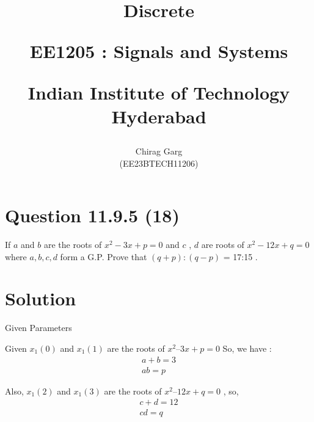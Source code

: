 \documentclass[journal,12pt,twocolumn]{IEEEtran}
\theoremstyle{remark}
\begin{document}
%




\vspace{3cm}

\title{
Discrete

\large{EE1205 : Signals and Systems}

Indian Institute of Technology Hyderabad
}
\author{Chirag Garg

(EE23BTECH11206)
}	





\maketitle

\newpage



\bigskip

\renewcommand{\thefigure}{\arabic{figure}}
\renewcommand{\thetable}{\arabic{table}}


\section{Question 11.9.5 (18)}
\vspace{0.5cm}
\begin{flushleft}
If $a$ and $b$ are the roots of $x^{2} -3x + p = 0$ and $c$ , $d$ are roots of $x^{2} - 12x + q = 0$ where $a,b,c,d$ form a G.P. Prove that $(q+p) : (q-p)$ = 17:15 .
\end{flushleft}  


\vspace{0.8cm}


\section{Solution} 

\begin{table}[htbp]
\centering
\resizebox{\columnwidth}{!}{
}
\caption{ Given Parameters}

\end{table}

Given $x_1(0)$ and $x_1(1)$ are the roots of $x^{2} – 3x + p = 0$
So, we have :
\begin{align}
 a+b = 3\\
 ab = p 
\end{align}

Also, $x_1(2)$ and $x_1(3)$ are the roots of $x^{2} – 12x + q = 0$ , so,
\begin{align}
c+d= 12 \\
cd = q
 \end{align}  
\end{document}
